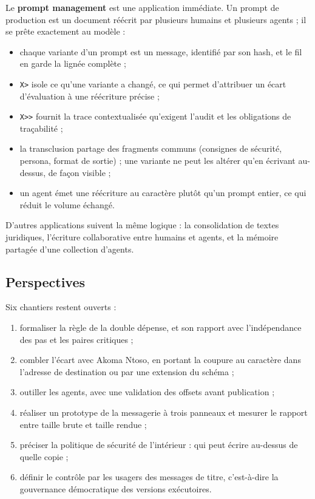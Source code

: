 \documentclass[11pt,a4paper]{article}
\newcommand{\cd}[1]{\texttt{#1}}
\begin{document}
Le \textbf{prompt management} est une application immédiate. Un prompt de production est un document réécrit par plusieurs humains et plusieurs agents ; il se prête exactement au modèle :
\begin{itemize}
  \item chaque variante d'un prompt est un message, identifié par son hash, et le fil en garde la lignée complète ;
  \item \cd{X>} isole ce qu'une variante a changé, ce qui permet d'attribuer un écart d'évaluation à une réécriture précise ;
  \item \cd{X>{}>} fournit la trace contextualisée qu'exigent l'audit et les obligations de traçabilité ;
  \item la transclusion partage des fragments communs (consignes de sécurité, persona, format de sortie) ; une variante ne peut les altérer qu'en écrivant au-dessus, de façon visible ;
  \item un agent émet une réécriture au caractère plutôt qu'un prompt entier, ce qui réduit le volume échangé.
\end{itemize}
D'autres applications suivent la même logique : la consolidation de textes juridiques, l'écriture collaborative entre humains et agents, et la mémoire partagée d'une collection d'agents.

\subsection{Perspectives}

Six chantiers restent ouverts :
\begin{enumerate}
  \item formaliser la règle de la double dépense, et son rapport avec l'indépendance des pas et les paires critiques ;
  \item combler l'écart avec Akoma Ntoso, en portant la coupure au caractère dans l'adresse de destination ou par une extension du schéma ;
  \item outiller les agents, avec une validation des offsets avant publication ;
  \item réaliser un prototype de la messagerie à trois panneaux et mesurer le rapport entre taille brute et taille rendue ;
  \item préciser la politique de sécurité de l'intérieur : qui peut écrire au-dessus de quelle copie ;
  \item définir le contrôle par les usagers des messages de titre, c'est-à-dire la gouvernance démocratique des versions exécutoires.
\end{enumerate}
\end{document}
